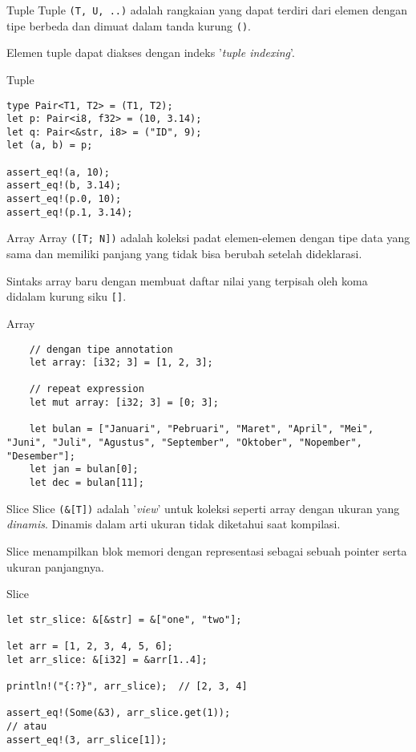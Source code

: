 \documentclass[14pt]{beamer}
\newcommand{\hilite}[1] {%
\texttt{\alert{#1}}}
\begin{document}
\begin{frame}[fragile]{Tuple}
Tuple \hilite{(T, U, ..)} adalah rangkaian yang dapat terdiri dari elemen dengan tipe berbeda dan dimuat dalam tanda kurung \hilite{()}.

Elemen tuple dapat diakses dengan indeks '\textit{tuple indexing}'.
\end{frame}

\begin{frame}[fragile]{Tuple}
\begin{verbatim}
type Pair<T1, T2> = (T1, T2);
let p: Pair<i8, f32> = (10, 3.14);
let q: Pair<&str, i8> = ("ID", 9);
let (a, b) = p;

assert_eq!(a, 10);
assert_eq!(b, 3.14);
assert_eq!(p.0, 10);
assert_eq!(p.1, 3.14);
\end{verbatim}
\end{frame}

\begin{frame}{Array}
Array \hilite{([T; N])} adalah koleksi padat elemen-elemen dengan tipe data yang sama dan memiliki panjang yang tidak bisa berubah setelah dideklarasi.

Sintaks array baru dengan membuat daftar nilai yang terpisah oleh koma didalam kurung siku \hilite{[]}.
\end{frame}

\begin{frame}[fragile]{Array}
    \begin{verbatim}
    // dengan tipe annotation
    let array: [i32; 3] = [1, 2, 3];
    
    // repeat expression
    let mut array: [i32; 3] = [0; 3];
    
    let bulan = ["Januari", "Pebruari", "Maret", "April", "Mei", "Juni", "Juli", "Agustus", "September", "Oktober", "Nopember", "Desember"];
    let jan = bulan[0];
    let dec = bulan[11];
    \end{verbatim}
\end{frame}

\begin{frame}[fragile]{Slice}
Slice \hilite{(\&[T])} adalah '\textit{view}' untuk koleksi seperti array dengan ukuran yang \emph{dinamis}. Dinamis dalam arti ukuran tidak diketahui saat kompilasi.

Slice menampilkan blok memori dengan representasi sebagai sebuah pointer serta ukuran panjangnya.

\end{frame}

\begin{frame}[fragile]{Slice}
\begin{verbatim}
let str_slice: &[&str] = &["one", "two"];

let arr = [1, 2, 3, 4, 5, 6];
let arr_slice: &[i32] = &arr[1..4];

println!("{:?}", arr_slice);  // [2, 3, 4]

assert_eq!(Some(&3), arr_slice.get(1));
// atau
assert_eq!(3, arr_slice[1]);
\end{verbatim}
\end{frame}
\end{document}
